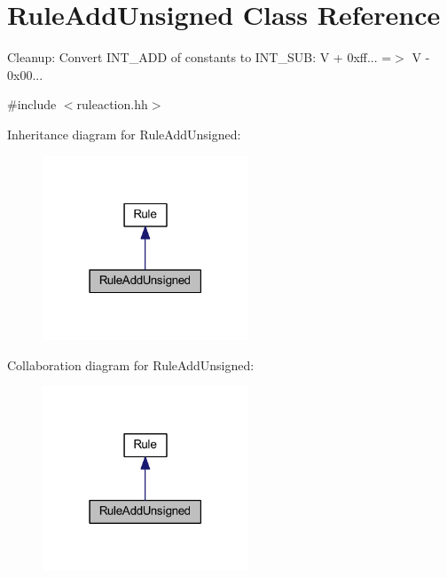 \hypertarget{class_rule_add_unsigned}{}\section{Rule\+Add\+Unsigned Class Reference}
\label{class_rule_add_unsigned}


Cleanup\+: Convert I\+N\+T\+\_\+\+A\+DD of constants to I\+N\+T\+\_\+\+S\+UB\+: {\ttfamily V + 0xff... =$>$ V -\/ 0x00...}  




{\ttfamily \#include $<$ruleaction.\+hh$>$}



Inheritance diagram for Rule\+Add\+Unsigned\+:
\nopagebreak
\begin{figure}[H]
\begin{center}
\leavevmode
\includegraphics[width=174pt]{class_rule_add_unsigned__inherit__graph}
\end{center}
\end{figure}


Collaboration diagram for Rule\+Add\+Unsigned\+:
\nopagebreak
\begin{figure}[H]
\begin{center}
\leavevmode
\includegraphics[width=174pt]{class_rule_add_unsigned__coll__graph}
\end{center}
\end{figure}
